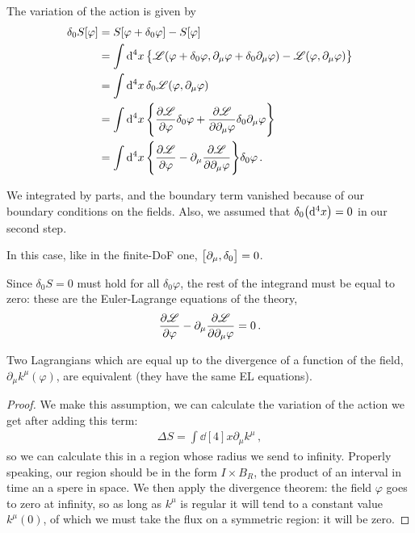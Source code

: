 \documentclass[main.tex]{subfiles}
\begin{document}
The variation of the action is given by 
%
\begin{subequations}
\begin{align}
\delta_0 S [\varphi ] &= S [ \varphi + \delta_0 \varphi ] - S[\varphi ]  \\
&= \int \dd[4]{x} \qty{ \mathscr{L} (\varphi + \delta_0 \varphi , \partial_{\mu } \varphi + \delta_0 \partial_{\mu } \varphi ) - \mathscr{L} (\varphi, \partial_{\mu } \varphi )}  \\
&= \int \dd[4]{x } \delta_0 \mathscr{L} (\varphi , \partial_{\mu }\varphi )  \\
&= \int \dd[4]{x} 
\qty{ \pdv{\mathscr{L}}{\varphi } \delta_0 \varphi  + \pdv{\mathscr{L}}{\partial_{\mu } \varphi } \delta_0\partial_{\mu }  \varphi  }  \\
&= \int \dd[4]{x} \qty{\pdv{\mathscr{L}}{\varphi } - \partial_{\mu }\pdv{\mathscr{L}}{\partial_{\mu } \varphi }} \delta_0 \varphi 
\,.
\end{align}
\end{subequations}

We integrated by parts, and the boundary term vanished because of our boundary conditions on the fields. 
Also, we assumed that \(\delta_0 \qty(\dd[4]{x}) =0 \) in our second step.

In this case, like in the finite-DoF one, \(\qty[\partial_{\mu }, \delta_0 ] =0\). 

Since \(\delta_0 S = 0\) must hold for all \(\delta_0 \varphi \), the rest of the integrand must be equal to zero: these are the Euler-Lagrange equations of the theory, 
%
\begin{align}
\pdv{\mathscr{L}}{\varphi } - \partial_{\mu }\pdv{\mathscr{L}}{\partial_{\mu } \varphi } =0
\,.
\end{align}


\begin{claim}
Two Lagrangians which are equal up to the divergence of a function of the field, \(\partial_{\mu } k^{\mu }(\varphi )\), are equivalent (they have the same EL equations).
\end{claim} 

\begin{proof}
We make this assumption, we can calculate the variation of the action we get after adding this term:
%
\begin{align}
\Delta S = \int \dd[4]{x} \partial_{\mu } k^{\mu } 
\,,
\end{align}
%
so we can calculate this in a region whose radius we send to infinity. Properly speaking, our region should be in the form \(I \times B_R\), the product of an interval in time an a spere in space. We then apply the divergence theorem: the field \(\varphi \) goes to zero at infinity, so as long as \(k^{\mu }\) is regular it will tend to a constant value \(k^{\mu } (0)\), of which we must take the flux on a symmetric region: it will be zero.
\end{proof}
\end{document}
